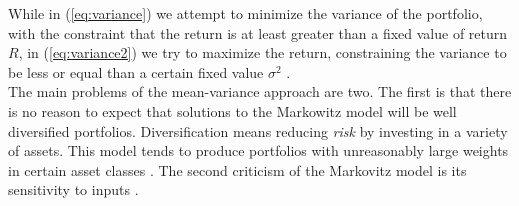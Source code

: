 While in (\ref{eq:variance}) we attempt to minimize the variance of the portfolio, with the constraint that the return is at least greater than a fixed value of return $R$, in (\ref{eq:variance2}) we try to maximize the return, constraining the variance to be less or equal than a certain fixed value $\sigma^2$ \cite{libro}.\\
The main problems of the mean-variance approach are two. The first is that there is no reason to expect that solutions to the Markowitz model will be well diversified portfolios. Diversification means reducing \textit{risk} by investing in a variety of assets. This model tends to produce portfolios with unreasonably large weights in certain asset classes \cite{libro}. The second criticism of the Markovitz model is its sensitivity to inputs \cite{tutuncu}.